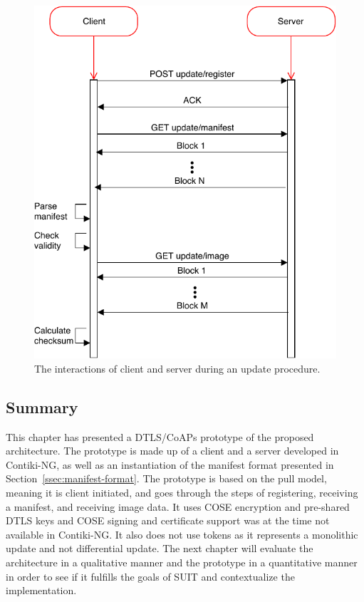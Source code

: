 \documentclass[0-thesis.tex]{subfiles}
\begin{document}
\begin{figure}[h!]
    \caption{The interactions of client and server during an update procedure.}
    \label{fig:client-server-interaction}
    \includegraphics{images/client-server-sequence.pdf}
\end{figure}

\subsection{Summary}
\label{ssec:implementation-summary}
This chapter has presented a DTLS/CoAPs prototype of the proposed architecture. The
prototype is made up of a client and a server developed in Contiki-NG, as well as an
instantiation of the manifest format presented in Section~\ref{ssec:manifest-format}. The
prototype is based on the pull model, meaning it is client initiated, and goes through the
steps of registering, receiving a manifest, and receiving image data. It uses COSE
encryption and pre-shared DTLS keys and COSE signing and certificate support was at the
time not available in Contiki-NG. It also does not use tokens as it represents a
monolithic update and not differential update. The next chapter will evaluate the
architecture in a qualitative manner and the prototype in a quantitative manner in order
to see if it fulfills the goals of SUIT and contextualize the implementation.
\end{document}
